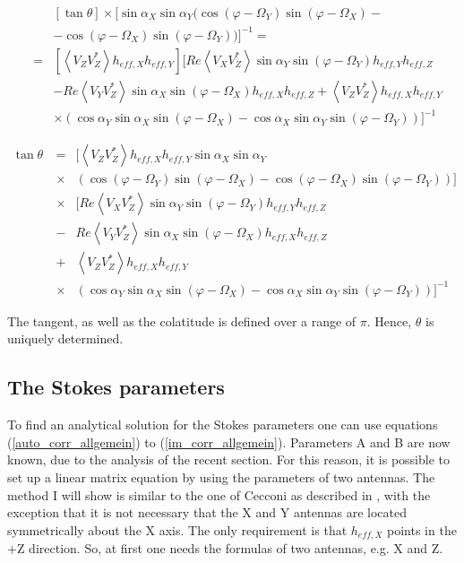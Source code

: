 \documentclass[a4paper,14pt]{extbook}
\begin{document}
\begin{eqnarray}
&&\left[ \tan \theta \right]  \times [ \sin \alpha_X  \sin \alpha_Y ( \cos (\varphi - \Omega_Y)  \sin (\varphi - \Omega_X)-\nonumber \\
&&-\cos (\varphi - \Omega_X)  \sin (\varphi - \Omega_Y))]^{-1} = \nonumber \\
&=& [\left\langle V_Z V_Z^{*} \right\rangle h_{eff,X} h_{eff,Y}]  [Re \left\langle V_X V_Z^{*}\right\rangle \sin \alpha_Y  \sin (\varphi - \Omega_Y) h_{eff,Y}h_{eff,Z}\nonumber \\
&&-Re\left\langle V_Y V_Z^{*}\right\rangle\sin \alpha_X  \sin (\varphi - \Omega_X) h_{eff,X}h_{eff,Z} +\left\langle V_Z V_Z^{*} \right\rangle h_{eff,X} h_{eff,Y} \nonumber \\
&&\times(\cos \alpha_Y \sin \alpha_X  \sin (\varphi - \Omega_X)-\cos \alpha_X  \sin \alpha_Y  \sin (\varphi - \Omega_Y))]^{-1}
\end{eqnarray}

\begin{eqnarray}\label{tan_theta}
\tan \theta\  &=&
[\left\langle V_Z V_Z^{*} \right\rangle h_{eff,X} h_{eff,Y} \sin \alpha_X  \sin \alpha_Y \\
&\times&( \cos (\varphi - \Omega_Y)  \sin (\varphi - \Omega_X) -\cos (\varphi - \Omega_X)  \sin (\varphi - \Omega_Y))]\nonumber \\
&\times& [Re \left\langle V_X V_Z^{*}\right\rangle \sin \alpha_Y  \sin (\varphi - \Omega_Y) h_{eff,Y}h_{eff,Z} \nonumber \\
&-&Re\left\langle V_Y V_Z^{*}\right\rangle\sin \alpha_X  \sin (\varphi - \Omega_X) h_{eff,X}h_{eff,Z}\nonumber \\
&+&\left\langle V_Z V_Z^{*} \right\rangle h_{eff,X} h_{eff,Y} \nonumber \\
&\times&(\cos \alpha_Y \sin \alpha_X  \sin (\varphi - \Omega_X)-\cos \alpha_X  \sin \alpha_Y  \sin (\varphi - \Omega_Y))]^{-1} \nonumber
\end{eqnarray}

The tangent, as well as the colatitude is defined over a range of $\pi$. Hence, $\theta$ is uniquely determined.

\subsection{The Stokes parameters}

To find an analytical solution for the Stokes parameters one can use equations (\ref{auto_corr_allgemein}) to (\ref{im_corr_allgemein}). Parameters A and B are now known, due to the analysis of the recent section. For this reason, it is possible to set up a linear matrix equation by using the parameters of two antennas. The method I will show is similar to the one of Cecconi as described in \cite{cecconi04}, with the exception that it is not necessary that the X and Y antennas are located symmetrically about the X axis. The only requirement is that $h_{eff,X}$  points in the +Z direction. So, at first one needs the formulas of two antennas, e.g. X and Z.
\end{document}
